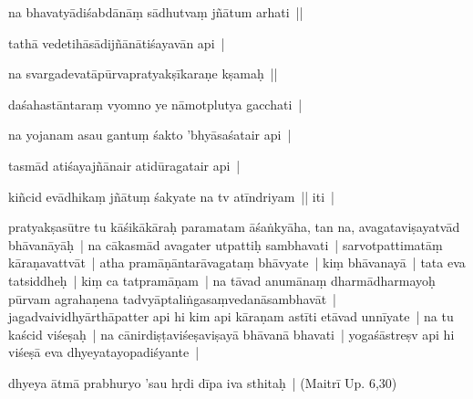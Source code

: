 \documentclass[article,12pt,a4paper]{memoir}%
\newcounter{parCount}
\begin{document}
	  \pstart \leavevmode%
	na bhavatyādiśabdānāṃ sādhutvaṃ jñātum arhati || 
	{}
	\pend%
      

	  \pstart \leavevmode%
	tathā vedetihāsādijñānātiśayavān api | 
	{}
	\pend%
      

	  \pstart \leavevmode%
	na svargadevatāpūrvapratyakṣīkaraṇe kṣamaḥ || 
	{}
	\pend%
      

	  \pstart \leavevmode%
	daśahastāntaraṃ vyomno ye nāmotplutya gacchati | 
	{}
	\pend%
      

	  \pstart \leavevmode%
	na yojanam asau gantuṃ śakto 'bhyāsaśatair api | 
	{}
	\pend%
      

	  \pstart \leavevmode%
	tasmād atiśayajñānair atidūragatair api | 
	{}
	\pend%
      

	  \pstart \leavevmode%
	kiñcid evādhikaṃ jñātuṃ śakyate na tv atīndriyam || iti | 
	{}
	\pend%
      

	  \pstart \leavevmode%
	\label{thakur75-9.20}pratyakṣasūtre tu kāśikākāraḥ paramatam āśaṅkyāha, tan na, avagataviṣayatvād bhāvanāyāḥ | na cākasmād avagater utpattiḥ sambhavati | sarvotpattimatāṃ kāraṇavattvāt | atha pramāṇāntarāvagataṃ bhāvyate | kiṃ bhāvanayā | tata eva tatsiddheḥ | kiṃ ca tatpramāṇam | na tāvad anumānaṃ dharmādharmayoḥ pūrvam agrahaṇena tadvyāptaliṅgasaṃvedanāsambhavāt | jagadvaividhyārthāpatter api hi kim api kāraṇam astīti etāvad unnīyate | na tu kaścid viśeṣaḥ | na cānirdiṣṭaviśeṣaviṣayā bhāvanā bhavati | yogaśāstreṣv api hi viśeṣā eva dhyeyatayopadiśyante | 
	{}
	\pend%
      

	  \pstart \leavevmode%
	dhyeya ātmā prabhuryo 'sau hṛdi dīpa iva sthitaḥ | (Maitrī Up. 6,30) 
	{}
	\pend%
      
\end{document}
